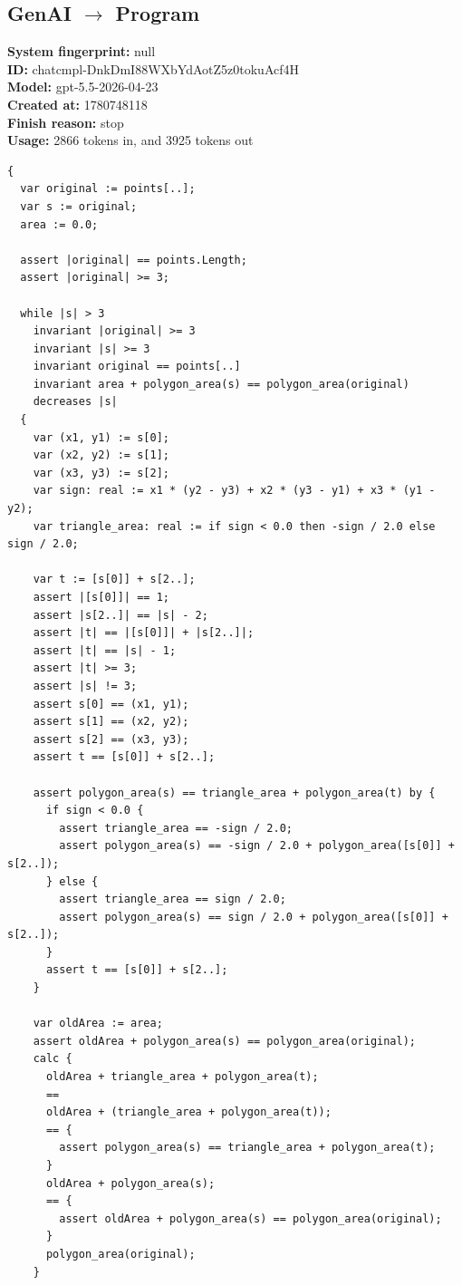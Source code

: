 \documentclass{article}
\begin{document}
\subsection*{GenAI $\rightarrow$ Program}
\textbf{System fingerprint: }null
\\\textbf{ID: }chatcmpl-DnkDmI88WXbYdAotZ5z0tokuAcf4H
\\\textbf{Model: }gpt-5.5-2026-04-23
\\\textbf{Created at: }1780748118
\\\textbf{Finish reason: }stop
\\\textbf{Usage: }2866 tokens in, and 3925 tokens out
\begin{lstlisting}
{
  var original := points[..];
  var s := original;
  area := 0.0;

  assert |original| == points.Length;
  assert |original| >= 3;

  while |s| > 3
    invariant |original| >= 3
    invariant |s| >= 3
    invariant original == points[..]
    invariant area + polygon_area(s) == polygon_area(original)
    decreases |s|
  {
    var (x1, y1) := s[0];
    var (x2, y2) := s[1];
    var (x3, y3) := s[2];
    var sign: real := x1 * (y2 - y3) + x2 * (y3 - y1) + x3 * (y1 - y2);
    var triangle_area: real := if sign < 0.0 then -sign / 2.0 else sign / 2.0;

    var t := [s[0]] + s[2..];
    assert |[s[0]]| == 1;
    assert |s[2..]| == |s| - 2;
    assert |t| == |[s[0]]| + |s[2..]|;
    assert |t| == |s| - 1;
    assert |t| >= 3;
    assert |s| != 3;
    assert s[0] == (x1, y1);
    assert s[1] == (x2, y2);
    assert s[2] == (x3, y3);
    assert t == [s[0]] + s[2..];

    assert polygon_area(s) == triangle_area + polygon_area(t) by {
      if sign < 0.0 {
        assert triangle_area == -sign / 2.0;
        assert polygon_area(s) == -sign / 2.0 + polygon_area([s[0]] + s[2..]);
      } else {
        assert triangle_area == sign / 2.0;
        assert polygon_area(s) == sign / 2.0 + polygon_area([s[0]] + s[2..]);
      }
      assert t == [s[0]] + s[2..];
    }

    var oldArea := area;
    assert oldArea + polygon_area(s) == polygon_area(original);
    calc {
      oldArea + triangle_area + polygon_area(t);
      ==
      oldArea + (triangle_area + polygon_area(t));
      == {
        assert polygon_area(s) == triangle_area + polygon_area(t);
      }
      oldArea + polygon_area(s);
      == {
        assert oldArea + polygon_area(s) == polygon_area(original);
      }
      polygon_area(original);
    }


\end{lstlisting}
\end{document}
